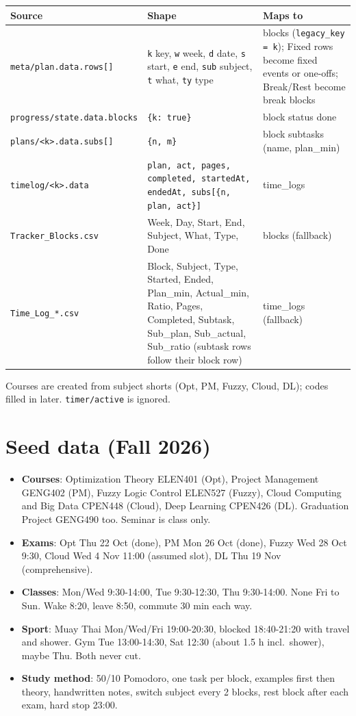 \documentclass[11pt,a4paper]{article}
\newcommand{\code}[1]{\texttt{\small #1}}
\begin{document}
\begin{longtable}{L{4.2cm}L{6.3cm}L{4.7cm}}
\toprule
\textbf{Source} & \textbf{Shape} & \textbf{Maps to} \\
\midrule
\endhead
\code{meta/plan.\allowbreak data.rows[]} & \code{k} key, \code{w} week, \code{d} date, \code{s} start, \code{e} end, \code{sub} subject, \code{t} what, \code{ty} type & blocks (\code{legacy\_key = k}); Fixed rows become fixed events or one-offs; Break/Rest become break blocks \\
\code{progress/state.\allowbreak data.blocks} & \code{\{k: true\}} & block status done \\
\code{plans/<k>.data.subs[]} & \code{\{n, m\}} & block subtasks (name, plan\_min) \\
\code{timelog/<k>.data} & \code{plan, act, pages, completed, startedAt, endedAt, subs[\{n, plan, act\}]} & time\_logs \\
\code{Tracker\_Blocks.csv} & Week, Day, Start, End, Subject, What, Type, Done & blocks (fallback) \\
\code{Time\_Log\_*.csv} & Block, Subject, Type, Started, Ended, Plan\_min, Actual\_min, Ratio, Pages, Completed, Subtask, Sub\_plan, Sub\_actual, Sub\_ratio (subtask rows follow their block row) & time\_logs (fallback) \\
\bottomrule
\end{longtable}

Courses are created from subject shorts (Opt, PM, Fuzzy, Cloud, DL); codes filled in later. \code{timer/active} is ignored.

\section{Seed data (Fall 2026)}

\begin{itemize}
  \item \textbf{Courses}: Optimization Theory ELEN401 (Opt), Project Management GENG402 (PM), Fuzzy Logic Control ELEN527 (Fuzzy), Cloud Computing and Big Data CPEN448 (Cloud), Deep Learning CPEN426 (DL). Graduation Project GENG490 too. Seminar is class only.
  \item \textbf{Exams}: Opt Thu 22 Oct (done), PM Mon 26 Oct (done), Fuzzy Wed 28 Oct 9:30, Cloud Wed 4 Nov 11:00 (assumed slot), DL Thu 19 Nov (comprehensive).
  \item \textbf{Classes}: Mon/Wed 9:30-14:00, Tue 9:30-12:30, Thu 9:30-14:00. None Fri to Sun. Wake 8:20, leave 8:50, commute 30 min each way.
  \item \textbf{Sport}: Muay Thai Mon/Wed/Fri 19:00-20:30, blocked 18:40-21:20 with travel and shower. Gym Tue 13:00-14:30, Sat 12:30 (about 1.5 h incl.\ shower), maybe Thu. Both never cut.
  \item \textbf{Study method}: 50/10 Pomodoro, one task per block, examples first then theory, handwritten notes, switch subject every 2 blocks, rest block after each exam, hard stop 23:00.
\end{itemize}
\end{document}
